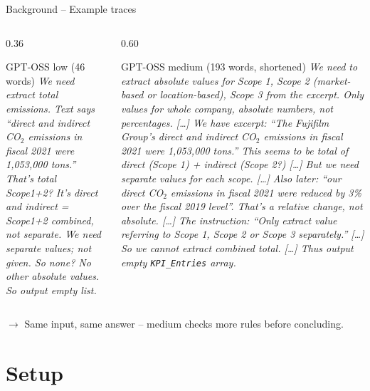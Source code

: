 \documentclass[aspectratio=169, 10pt]{beamer}
\begin{document}
\begin{frame}{Background -- Example traces}
\begin{columns}[T]

\begin{column}{0.36\textwidth}
\begin{block}{GPT-OSS low (46 words)}
\scriptsize\itshape
We need extract total emissions. Text says ``direct and indirect CO$_2$
emissions in fiscal 2021 were 1,053,000 tons.'' That's total Scope1+2? It's
direct and indirect = Scope1+2 combined, not separate. We need separate
values; not given. So none? No other absolute values. So output empty list.
\end{block}
\end{column}

\begin{column}{0.60\textwidth}
\begin{block}{GPT-OSS medium (193 words, shortened)}
\scriptsize\itshape
We need to extract absolute values for Scope 1, Scope 2 (market-based or
location-based), Scope 3 from the excerpt. Only values for whole company,
absolute numbers, not percentages. [\dots]
We have excerpt: ``The Fujifilm Group's direct and indirect CO$_2$ emissions in
fiscal 2021 were 1,053,000 tons.'' This seems to be total of direct (Scope 1) +
indirect (Scope 2?) [\dots] But we need separate values for each scope. [\dots]
Also later: ``our direct CO$_2$ emissions in fiscal 2021 were reduced by 3\% over
the fiscal 2019 level''. That's a relative change, not absolute. [\dots]
The instruction: ``Only extract value referring to Scope 1, Scope 2 or Scope 3
separately.'' [\dots] So we cannot extract combined total. [\dots]
Thus output empty \texttt{KPI\_Entries} array.
\end{block}
\end{column}

\end{columns}

\vspace{0.6em}
\begin{center}
$\rightarrow$ Same input, same answer -- medium checks more rules before concluding.
\end{center}
\end{frame}
\section{Setup}
\end{document}
